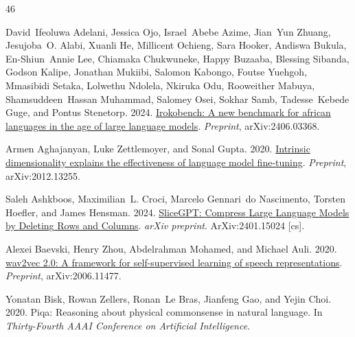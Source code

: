 \documentclass[11pt]{article}
\begin{document}
%
\begin{thebibliography}{46}
\providecommand{\natexlab}[1]{#1}

David~Ifeoluwa Adelani, Jessica Ojo, Israel~Abebe Azime, Jian~Yun Zhuang, Jesujoba~O. Alabi, Xuanli He, Millicent Ochieng, Sara Hooker, Andiswa Bukula, En-Shiun~Annie Lee, Chiamaka Chukwuneke, Happy Buzaaba, Blessing Sibanda, Godson Kalipe, Jonathan Mukiibi, Salomon Kabongo, Foutse Yuehgoh, Mmasibidi Setaka, Lolwethu Ndolela, Nkiruka Odu, Rooweither Mabuya, Shamsuddeen~Hassan Muhammad, Salomey Osei, Sokhar Samb, Tadesse~Kebede Guge, and Pontus Stenetorp. 2024.
\newblock \href {https://arxiv.org/abs/2406.03368} {Irokobench: A new benchmark for african languages in the age of large language models}.
\newblock \emph{Preprint}, arXiv:2406.03368.

Armen Aghajanyan, Luke Zettlemoyer, and Sonal Gupta. 2020.
\newblock \href {https://arxiv.org/abs/2012.13255} {Intrinsic dimensionality explains the effectiveness of language model fine-tuning}.
\newblock \emph{Preprint}, arXiv:2012.13255.

Saleh Ashkboos, Maximilian~L. Croci, Marcelo Gennari~do Nascimento, Torsten Hoefler, and James Hensman. 2024.
\newblock \href {http://arxiv.org/abs/2401.15024} {{SliceGPT}: {Compress} {Large} {Language} {Models} by {Deleting} {Rows} and {Columns}}.
\newblock \emph{arXiv preprint}.
\newblock ArXiv:2401.15024 [cs].

Alexei Baevski, Henry Zhou, Abdelrahman Mohamed, and Michael Auli. 2020.
\newblock \href {https://arxiv.org/abs/2006.11477} {wav2vec 2.0: A framework for self-supervised learning of speech representations}.
\newblock \emph{Preprint}, arXiv:2006.11477.

Yonatan Bisk, Rowan Zellers, Ronan~Le Bras, Jianfeng Gao, and Yejin Choi. 2020.
\newblock Piqa: Reasoning about physical commonsense in natural language.
\newblock In \emph{Thirty-Fourth AAAI Conference on Artificial Intelligence}.


\end{thebibliography}
\end{document}
